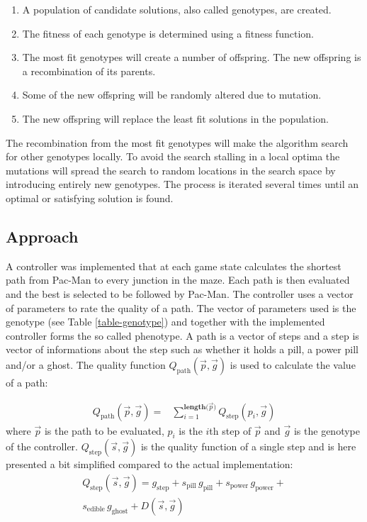 \documentclass[conference]{IEEEtran}
\begin{document}
\begin{enumerate}
  \item A population of candidate solutions, also called genotypes, are created.
  \item The fitness of each genotype is determined using a fitness function.
  \item The most fit genotypes will create a number of offspring. The new offspring is a recombination of its parents.
  \item Some of the new offspring will be randomly altered due to mutation.
  \item The new offspring will replace the least fit solutions in the population.
\end{enumerate}

The recombination from the most fit genotypes will make the algorithm search for other genotypes locally. To avoid the search stalling in a local optima the mutations will spread the search to random locations in the search space by introducing entirely new genotypes. The process is iterated several times until an optimal or satisfying solution is found. 

\subsection{Approach}
A controller was implemented that at each game state calculates the shortest path from Pac-Man to every junction in the maze. Each path is then evaluated and the best is selected to be followed by Pac-Man. The controller uses a vector of parameters to rate the quality of a path. The vector of parameters used is the genotype (see Table \ref{table-genotype}) and together with the implemented controller forms the so called phenotype. A path is a vector of steps and a step is vector of informations about the step such as whether it holds a pill, a power pill and/or a ghost. The quality function $Q_{\mathrm{path}}(\vec{p}, \vec{g})$ is used to calculate the value of a path:

\begin{align}
Q_{\mathrm{path}}(\vec{p}, \vec{g})=& \sum_{i = 1}^{\mathbf{length(}\vec{p})} Q_{\mathrm{step}}(p_i, \vec{g}) \nonumber
\end{align}
where $\vec{p}$ is the path to be evaluated, $p_i$ is the $i$th step of $\vec{p}$ and $\vec{g}$ is the genotype of the controller. $Q_{\mathrm{step}}(\vec{s}, \vec{g})$ is the quality function of a single step and is here presented a bit simplified compared to the actual implementation:
\begin{eqnarray}
Q_{\mathrm{step}}(\vec{s}, \vec{g})= g_{\mathrm{step}} + s_{\mathrm{pill}} \, g_{\mathrm{pill}} + s_{\mathrm{power}} \, g_{\mathrm{power}} + \nonumber \\
s_{\mathrm{edible}} \, g_{\mathrm{ghost}} + D(\vec{s}, \vec{g}) \nonumber
\end{eqnarray}
\end{document}
